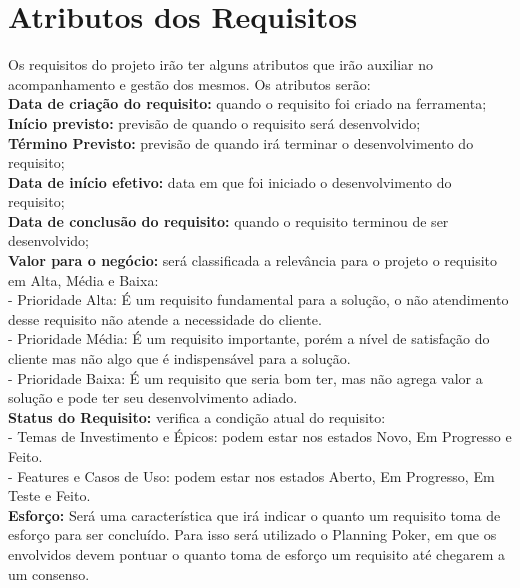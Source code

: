 \section{Atributos dos Requisitos}
Os requisitos do projeto irão ter alguns atributos que irão auxiliar no acompanhamento e gestão dos mesmos. Os atributos serão:\\
\tab \textbf{Data de criação do requisito:} quando o requisito foi criado na ferramenta;\\
\tab \textbf{Início previsto:} previsão de quando o requisito será desenvolvido;\\
\tab \textbf{Término Previsto:} previsão de quando irá terminar o desenvolvimento do requisito;\\
\tab \textbf{Data de início efetivo:} data em que foi iniciado o desenvolvimento do requisito;\\
\tab \textbf{Data de conclusão do requisito:} quando o requisito terminou de ser desenvolvido;\\
\tab \textbf{Valor para o negócio:} será classificada a relevância para o projeto o requisito em Alta, Média e Baixa:\\
\tab - Prioridade Alta: É um requisito fundamental para a solução, o não atendimento desse requisito não atende a necessidade do cliente.\\
\tab - Prioridade Média: É um requisito importante, porém a nível de satisfação do cliente mas não algo que é indispensável para a solução.\\
\tab - Prioridade Baixa: É um requisito que seria bom ter, mas não agrega valor a solução e pode ter seu desenvolvimento adiado.\\
\tab \textbf{Status do Requisito:} verifica a condição atual do requisito:\\
\tab - Temas de Investimento e Épicos: podem estar nos estados Novo, Em Progresso e Feito.\\
\tab - Features e Casos de Uso: podem estar nos estados Aberto, Em Progresso, Em Teste e Feito.\\
\tab \textbf{Esforço:} Será uma característica que irá indicar o quanto um requisito toma de esforço para ser concluído. Para isso será utilizado o Planning Poker, em que os envolvidos devem pontuar o quanto toma de esforço um requisito até chegarem a um consenso.\\
